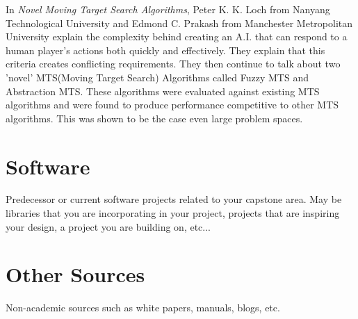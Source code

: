 In {\it Novel Moving Target Search Algorithms}, Peter K. K. Loch from Nanyang Technological University and Edmond C. Prakash from Manchester Metropolitan University explain the complexity behind creating an A.I. that can respond to a human player's actions both quickly and effectively. They explain that this criteria creates conflicting requirements. They then continue to talk about two 'novel' MTS(Moving Target Search) Algorithms called Fuzzy MTS and Abstraction MTS. These algorithms were evaluated against existing MTS algorithms and were found to produce performance competitive to other MTS algorithms. This was shown to be the case even large problem spaces.


\section{Software}
Predecessor or current software projects related to your capstone area. May be libraries that you are incorporating in your project, projects that are inspiring your design, a project you are building on, etc...




\section{Other Sources}

Non-academic sources such as white papers, manuals, blogs, etc.

